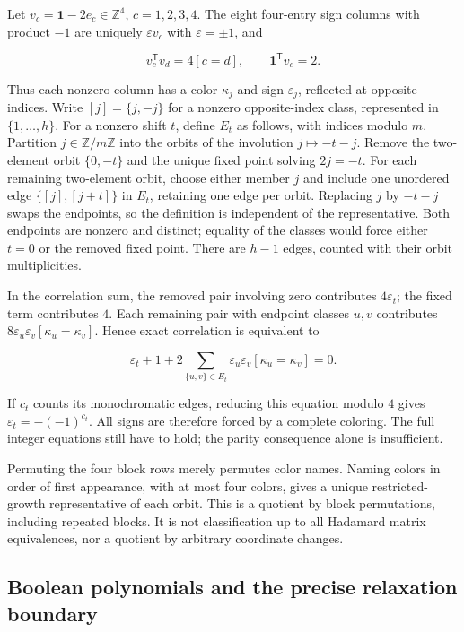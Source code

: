 \documentclass[
  11pt,
]{article}
\begin{document}
Let \(v_c=\mathbf1-2e_c\in\mathbb Z^4\), \(c=1,2,3,4\). The eight
four-entry sign columns with product \(-1\) are uniquely
\(\varepsilon v_c\) with \(\varepsilon=\pm1\), and

\[v_c^{\mathsf T}v_d=4[c=d],\qquad
\mathbf1^{\mathsf T}v_c=2.\]

Thus each nonzero column has a color \(\kappa_j\) and sign
\(\varepsilon_j\), reflected at opposite indices. Write \([j]=\{j,-j\}\)
for a nonzero opposite-index class, represented in \(\{1,\ldots,h\}\).
For a nonzero shift \(t\), define \(E_t\) as follows, with indices
modulo \(m\). Partition \(j\in\mathbb Z/m\mathbb Z\) into the orbits of
the involution \(j\mapsto-t-j\). Remove the two-element orbit
\(\{0,-t\}\) and the unique fixed point solving \(2j=-t\). For each
remaining two-element orbit, choose either member \(j\) and include one
unordered edge \(\{[j],[j+t]\}\) in \(E_t\), retaining one edge per
orbit. Replacing \(j\) by \(-t-j\) swaps the endpoints, so the
definition is independent of the representative. Both endpoints are
nonzero and distinct; equality of the classes would force either \(t=0\)
or the removed fixed point. There are \(h-1\) edges, counted with their
orbit multiplicities.

In the correlation sum, the removed pair involving zero contributes
\(4\varepsilon_t\); the fixed term contributes \(4\). Each remaining
pair with endpoint classes \(u,v\) contributes
\(8\varepsilon_u\varepsilon_v[\kappa_u=\kappa_v]\). Hence exact
correlation is equivalent to

\[\varepsilon_t+1+
2\sum_{\{u,v\}\in E_t}\varepsilon_u\varepsilon_v
[\kappa_u=\kappa_v]=0.\]

If \(c_t\) counts its monochromatic edges, reducing this equation modulo
\(4\) gives \(\varepsilon_t=-(-1)^{c_t}\). All signs are therefore
forced by a complete coloring. The full integer equations still have to
hold; the parity consequence alone is insufficient.

Permuting the four block rows merely permutes color names. Naming colors
in order of first appearance, with at most four colors, gives a unique
restricted-growth representative of each orbit. This is a quotient by
block permutations, including repeated blocks. It is not classification
up to all Hadamard matrix equivalences, nor a quotient by arbitrary
coordinate changes.

\subsection{Boolean polynomials and the precise relaxation
boundary}\label{boolean-polynomials-and-the-precise-relaxation-boundary}
\end{document}
